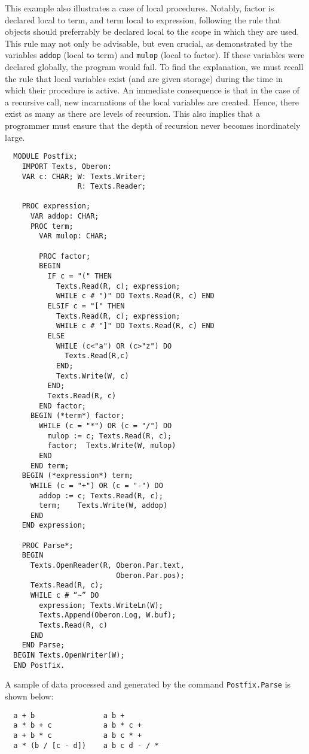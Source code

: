 This example also illustrates a case of local procedures. Notably, factor is declared local
to term, and term local to expression, following the rule that objects should preferrably
be declared local to the scope in which they are used. This rule may not only be advisable,
but even crucial, as demonstrated by the variables \verb|addop| (local to term) and
\verb|mulop| (local to factor). If these variables were declared globally, the program
would fail. To find the explanation, we must recall the rule that local variables exist
(and are given storage) during the time in which their procedure is active. An immediate
consequence is that in the case of a recursive call, new incarnations of the local variables
are created. Hence, there exist as many as there are levels of recursion. This also implies
that a programmer must ensure that the depth of recursion never becomes inordinately large.
\begin{verbatim}
  MODULE Postfix;
    IMPORT Texts, Oberon:
    VAR c: CHAR; W: Texts.Writer;
                 R: Texts.Reader;

    PROC expression;
      VAR addop: CHAR;
      PROC term;
        VAR mulop: CHAR;

        PROC factor;
        BEGIN
          IF c = "(" THEN
            Texts.Read(R, c); expression;
            WHILE c # ")" DO Texts.Read(R, c) END
          ELSIF c = "[" THEN
            Texts.Read(R, c); expression;
            WHILE c # "]" DO Texts.Read(R, c) END
          ELSE
            WHILE (c<"a") OR (c>"z") DO
              Texts.Read(R,c)
            END;
            Texts.Write(W, c)
          END;
          Texts.Read(R, c)
        END factor;
      BEGIN (*term*) factor;
        WHILE (c = "*") OR (c = "/") DO
          mulop := c; Texts.Read(R, c);
          factor;  Texts.Write(W, mulop)
        END
      END term;
    BEGIN (*expression*) term;
      WHILE (c = "+") OR (c = "-") DO
        addop := c; Texts.Read(R, c);
        term;    Texts.Write(W, addop)
      END
    END expression;
  
    PROC Parse*;
    BEGIN
      Texts.OpenReader(R, Oberon.Par.text,
                          Oberon.Par.pos);
      Texts.Read(R, c);
      WHILE c # “~” DO
        expression; Texts.WriteLn(W);
        Texts.Append(Oberon.Log, W.buf);
        Texts.Read(R, c)
      END
    END Parse;
  BEGIN Texts.OpenWriter(W);
  END Postfix.
\end{verbatim}
A sample of data processed and generated by the command \verb|Postfix.Parse| is shown below:
\begin{verbatim}
  a + b                a b +
  a * b + c            a b * c +
  a + b * c            a b c * +
  a * (b / [c - d])    a b c d - / *
\end{verbatim}

